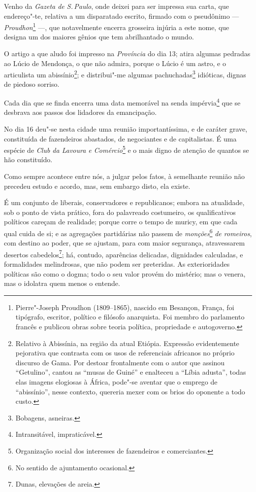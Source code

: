 Venho da \emph{Gazeta de S.\,Paulo}, onde deixei para ser impressa sua
carta, que endereço"-te, relativa a um disparatado escrito, firmado com o
pseudônimo --- \emph{Proudhon}\footnote{Pierre"-Joseph Proudhon
  (1809--1865), nascido em Besançon, França, foi tipógrafo, escritor,
  político e filósofo anarquista. Foi membro do parlamento francês e
  publicou obras sobre teoria política, propriedade e autogoverno.}
---, que notavelmente encerra grosseira injúria a este nome, que
designa um dos maiores gênios que tem abrilhantado o mundo.

O artigo a que aludo foi impresso na \emph{Província} do dia 13; atira
algumas pedradas ao Lúcio de Mendonça, o que não admira, porque o Lúcio
é um astro, e o articulista um abissínio\footnote{Relativo à
  Abissínia, na região da atual Etiópia. Expressão evidentemente
  pejorativa que contrasta com os usos de referenciais africanos no
  próprio discurso de Gama. Por destoar frontalmente com o autor que
  assinou ``Getulino'', cantou as ``musas de Guiné'' e enalteceu a ``Líbia
  adusta'', todas elas imagens elogiosas à África, pode"-se aventar que o
  emprego de ``abissínio'', nesse contexto, quereria mexer com os brios do
  oponente a todo custo.}; e distribui"-me algumas pachuchadas\footnote{
  Bobagens, asneiras.} idióticas, dignas de piedoso sorriso.

Cada dia que se finda encerra uma data memorável na senda
impérvia\footnote{Intransitável, impraticável.} que se desbrava aos
passos dos lidadores da emancipação.

No dia 16 deu"-se nesta cidade uma reunião importantíssima, e de caráter
grave, constituída de fazendeiros abastados, de negociantes e de
capitalistas. É uma espécie de \emph{Club da Lavoura e
Comércio}\footnote{Organização social dos interesses de fazendeiros e
  comerciantes.} e o mais digno de atenção de quantos se hão
constituído.

Como sempre acontece entre nós, a julgar pelos fatos, à semelhante
reunião não precedeu estudo e acordo, mas, sem embargo disto, ela
existe.

É um conjunto de liberais, conservadores e republicanos; embora na
atualidade, sob o ponto de vista prático, fora do palavreado costumeiro,
os qualificativos políticos careçam de realidade; porque corre o tempo
de muricy, em que cada qual cuida de si; e as agregações partidárias não
passem de \emph{monções}\footnote{No sentido de ajuntamento ocasional.}
\emph{de romeiros}, com destino ao poder, que se ajustam, para com maior
segurança, atravessarem desertos cabedelos\footnote{Dunas, elevações
  de areia.}; há, contudo, aparências delicadas, dignidades calculadas,
e formalidades melindrosas, que não podem ser preteridas. As
exterioridades políticas são como o dogma; todo o seu valor provém do
mistério; mas o venera, mas o idolatra quem menos o entende.

